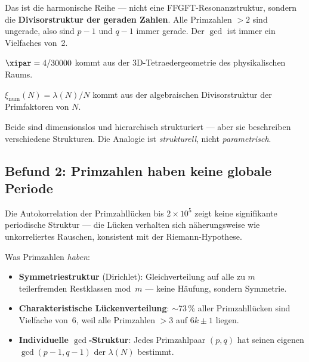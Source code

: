 Das ist die harmonische Reihe --- nicht eine
FFGFT-Resonanzstruktur, sondern die
\textbf{Divisorstruktur der geraden Zahlen}.
Alle Primzahlen $> 2$ sind ungerade,
also sind $p-1$ und $q-1$ immer gerade.
Der $\gcd$ ist immer ein Vielfaches von~2.

\begin{keypoint}
$\xipar = 4/30000$ kommt aus der
3D-Tetraedergeometrie des physikalischen Raums.

$\xi_\text{num}(N) = \lambda(N)/N$ kommt aus der
algebraischen Divisorstruktur der Primfaktoren von $N$.

Beide sind dimensionslos und hierarchisch strukturiert ---
aber sie beschreiben verschiedene Strukturen.
Die Analogie ist \emph{strukturell}, nicht \emph{parametrisch}.
\end{keypoint}

\subsection{Befund 2: Primzahlen haben keine globale Periode}

Die Autokorrelation der Primzahllücken bis $2 \times 10^5$
zeigt keine signifikante periodische Struktur ---
die Lücken verhalten sich näherungsweise wie
unkorreliertes Rauschen, konsistent mit der
Riemann-Hypothese.

Was Primzahlen \emph{haben}:
\begin{itemize}
  \item \textbf{Symmetriestruktur} (Dirichlet):
    Gleichverteilung auf alle zu $m$ teilerfremden
    Restklassen mod~$m$ --- keine Häufung,
    sondern Symmetrie.
  \item \textbf{Charakteristische Lückenverteilung}:
    $\sim$73\,\% aller Primzahllücken sind Vielfache
    von~6, weil alle Primzahlen $> 3$ auf $6k \pm 1$
    liegen.
  \item \textbf{Individuelle $\gcd$-Struktur}:
    Jedes Primzahlpaar $(p, q)$ hat seinen eigenen
    $\gcd(p-1, q-1)$ der $\lambda(N)$ bestimmt.
\end{itemize}

